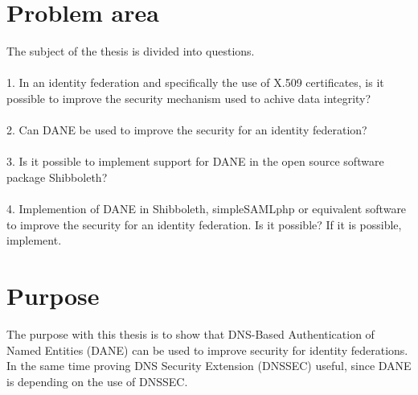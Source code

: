 
\section{Problem area}
The subject of the thesis is divided into questions.
\\\\
1. In an identity federation and specifically the use of X.509 certificates,
is it possible to improve the security mechanism used to achive data integrity?
\\\\
2. Can DANE be used to improve the security for an identity federation? 
\\\\
3. Is it possible to implement support for DANE in the open source software package Shibboleth? 
\\\\
4. Implemention of DANE in Shibboleth, simpleSAMLphp or equivalent software to improve the security for an identity federation. Is it possible?
If it is possible, implement.


\section{Purpose}
The purpose with this thesis is to show that DNS-Based Authentication of Named Entities (DANE) \cite{rfc:6394,rfc:draft-dane,rfc:draft-smime} can be used to improve security for identity federations.
In the same time proving DNS Security Extension (DNSSEC) \cite{rfc:4033,rfc:4034,rfc:4035,rfc:5011} useful, since DANE is 
depending on the use of DNSSEC.

